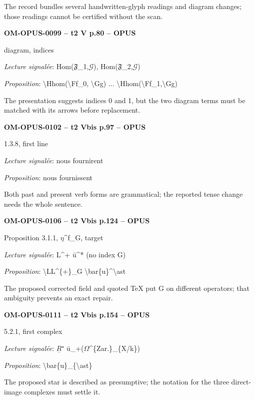 The record bundles several handwritten-glyph readings and diagram changes; those readings cannot be certified without the scan.\par
\par\noindent\textbf{OM-OPUS-0099 -- t2 V p.80 -- OPUS}\par
diagram, indices\par
\emph{Lecture signalée}: Hom(\ensuremath{𝔉}\_1,\ensuremath{𝒢}), Hom(\ensuremath{𝔉}\_2,\ensuremath{𝒢})\par
\emph{Proposition}: \textbackslash{}Hhom(\textbackslash{}Ff\_0, \textbackslash{}Gg) ... \textbackslash{}Hhom(\textbackslash{}Ff\_1,\textbackslash{}Gg)\par
The presentation suggests indices 0 and 1, but the two diagram terms must be matched with its arrows before replacement.\par
\par\noindent\textbf{OM-OPUS-0102 -- t2 Vbis p.97 -- OPUS}\par
1.3.8, first line\par
\emph{Lecture signalée}: nous fournirent\par
\emph{Proposition}: nous fournissent\par
Both past and present verb forms are grammatical; the reported tense change needs the whole sentence.\par
\par\noindent\textbf{OM-OPUS-0106 -- t2 Vbis p.124 -- OPUS}\par
Proposition 3.1.1, \ensuremath{\eta}\textasciicircum{}f\_G, target\par
\emph{Lecture signalée}: L\textasciicircum{}+ ū\textasciicircum{}* (no index G)\par
\emph{Proposition}: \textbackslash{}LL\textasciicircum{}\{+\}\_G \textbackslash{}bar\{u\}\textasciicircum{}\textbackslash{}ast\par
The proposed corrected field and quoted TeX put G on different operators; that ambiguity prevents an exact repair.\par
\par\noindent\textbf{OM-OPUS-0111 -- t2 Vbis p.154 -- OPUS}\par
5.2.1, first complex\par
\emph{Lecture signalée}: \ensuremath{\underline{R}}⁺ ū\_+(\ensuremath{\Omega}\textasciicircum{}\{Zar.\}\_\{X/k\})\par
\emph{Proposition}: \textbackslash{}bar\{u\}\_\{\textbackslash{}ast\}\par
The proposed star is described as presumptive; the notation for the three direct-image complexes must settle it.\par
